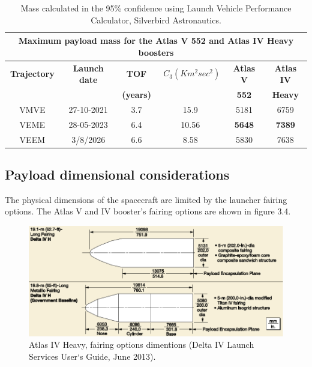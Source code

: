 \begin{table}[htb]
  \centering
    \begin{tabular}{|c|r|r|r|r|r|}
    \multicolumn{6}{c}{\textbf{Maximum payload mass for the Atlas V 552 and Atlas IV Heavy boosters}} \bigstrut[b]\\
    \hline
    \textbf{Trajectory} & \multicolumn{1}{c|}{\textbf{Launch date}} & \multicolumn{1}{c|}{\textbf{TOF }} & $C_3(Km^{2}sec^{2})$ & \multicolumn{1}{c|}{\textbf{Atlas V }} & \multicolumn{1}{c|}{\textbf{Atlas IV}} \bigstrut[t]\\
    \textbf{} & \multicolumn{1}{c|}{\textbf{}} & \multicolumn{1}{c|}{\textbf{(years)}} & \multicolumn{1}{c|}{\textbf{}} & \multicolumn{1}{c|}{\textbf{552}} & \multicolumn{1}{c|}{\textbf{Heavy}} \bigstrut[b]\\
    \hline
    VMVE  & \multicolumn{1}{c|}{27-10-2021} & \multicolumn{1}{c|}{3.7} & \multicolumn{1}{c|}{15.9} & \multicolumn{1}{c|}{5181} & \multicolumn{1}{c|}{6759} \bigstrut\\
    \hline
    VEME  & \multicolumn{1}{c|}{28-05-2023} & \multicolumn{1}{c|}{6.4} & \multicolumn{1}{c|}{10.56} & \multicolumn{1}{c|}{\textbf{5648}} & \multicolumn{1}{c|}{\textbf{7389}} \bigstrut\\
    \hline
    VEEM  & \multicolumn{1}{c|}{3/8/2026} & \multicolumn{1}{c|}{6.6} & \multicolumn{1}{c|}{8.58} & \multicolumn{1}{c|}{5830} & \multicolumn{1}{c|}{7638} \bigstrut\\
    \hline
    \end{tabular}%
    \caption{Mass calculated in the 95\% confidence using Launch Vehicle Performance Calculator, Silverbird Astronautics.}
  \label{tab:trajKg}%
\end{table}%

\subsection{Payload dimensional considerations}
The physical dimensions of the spacecraft are limited by the launcher fairing options. The Atlas V and IV booster’s fairing options are shown in figure 3.4.

\begin{figure}[htb]
\centering
\includegraphics[width=1\textwidth]{figures/Orbiter/fairingsIV.png}
\caption{Atlas IV Heavy, fairing options dimentions (Delta IV Launch Services User‘s Guide, June 2013).\cite{Atlasm}}
\end{figure}

